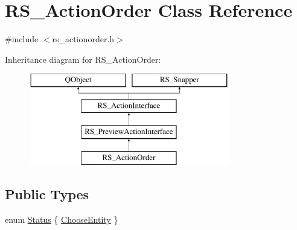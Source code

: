 \hypertarget{classRS__ActionOrder}{\section{R\-S\-\_\-\-Action\-Order Class Reference}
\label{classRS__ActionOrder}
}


{\ttfamily \#include $<$rs\-\_\-actionorder.\-h$>$}

Inheritance diagram for R\-S\-\_\-\-Action\-Order\-:\begin{figure}[H]
\begin{center}
\leavevmode
\includegraphics[height=4.000000cm]{classRS__ActionOrder}
\end{center}
\end{figure}
\subsection*{Public Types}
\begin{DoxyCompactItemize}
\item 
enum \hyperlink{classRS__ActionOrder_a73c1b6d1065fb42673b4b1494a406a2a}{Status} \{ \hyperlink{classRS__ActionOrder_a73c1b6d1065fb42673b4b1494a406a2aa8dee5ef432cbbf2d27129927d4c22fee}{Choose\-Entity}
 \}
\end{DoxyCompactItemize}
